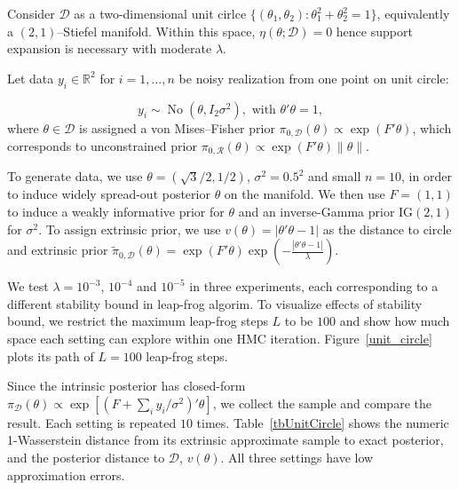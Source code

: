 \documentclass[10pt]{article}
\newcommand{\mc}[1]{\mathcal{#1}}
\DeclareMathOperator{\No}{No}
\DeclareMathOperator{\1}{\mathbbm{1}}
\begin{document}
Consider $\mc D$ as a two-dimensional unit cirlce $\{(\theta_1,\theta_2):\theta_1^2+\theta_2^2=1\}$, equivalently a $(2,1)$--Stiefel manifold. Within this space, $\eta(\theta;\mc D) =0$ hence support expansion is necessary with moderate $\lambda$.

Let data $y_i\in \mathbb{R}^2$ for $i=1,\ldots,n$  be noisy realization from one point on unit circle:

$$y_i\sim \No(\theta, I_2\sigma^2),\text{ with } \theta'\theta=1,$$
where $\theta \in \mc D$ is assigned a von Mises--Fisher prior $\pi_{0,\mc D}(\theta) \propto \exp(F'\theta)$, which corresponds to unconstrained prior $\pi_{0,\mc R}(\theta) \propto \exp(F'\theta)\|\theta\|$.

 To generate data, we use $\theta= (\sqrt 3/2, 1/2)$, $\sigma^2=0.5^2$ and small $n=10$, in order to induce widely spread-out posterior $\theta$ on the manifold. We then use $F=(1,1)$ to induce a weakly informative prior for $\theta$ and an inverse-Gamma prior $\text{IG}(2,1)$ for $\sigma^2$. To assign extrinsic prior, we use $v(\theta)=|\theta'\theta -1|$ as the distance to circle and extrinsic prior $\tilde\pi_{0,\mc D}(\theta)= \exp(F'\theta) \exp(-\frac{|\theta'\theta -1|}{\lambda})$.

We test $\lambda = 10^{-3}$, $10^{-4}$ and $10^{-5}$ in three experiments, each corresponding to a different stability bound in leap-frog algorim. To visualize effects of stability bound, we restrict the maximum leap-frog steps $L$ to be $100$ and show how much space each setting can explore within one HMC iteration. Figure~\ref{unit_circle} plots its path of $L=100$ leap-frog steps.

Since the intrinsic posterior has closed-form $\pi_{\mc D}(\theta)\propto \exp [(F+\sum_i y_i/\sigma^2)'\theta]$, we collect the sample and compare the result. Each setting is repeated $10$ times. Table~\ref{tbUnitCircle} shows the numeric 1-Wasserstein distance from its extrinsic approximate sample to exact posterior, and the posterior distance to $\mc D$, $v(\theta)$. All three settings have low approximation errors.
\end{document}
